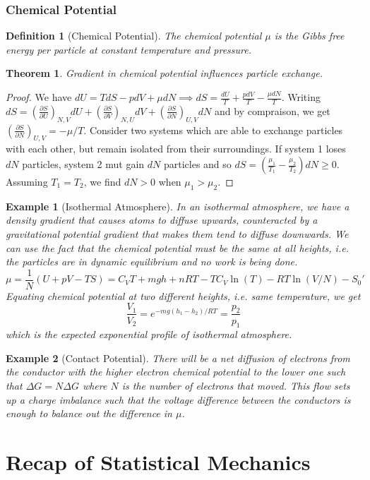 \documentclass[a4paper]{article}
\newtheorem{defi}{Definition}[section]
\newtheorem{eg}{Example}[section]
\newtheorem{thm}{Theorem}[section]
\theoremstyle{new}
\begin{document}
\subsubsection*{Chemical Potential}
\begin{defi}[Chemical Potential]
The chemical potential $\mu$ is the Gibbs free energy per particle at constant temperature and pressure.
\end{defi}
\begin{thm}
Gradient in chemical potential influences particle exchange.
\end{thm}
\begin{proof}
We have $dU=TdS-pdV+\mu dN\implies dS=\frac{dU}{T}+\frac{pdV}{T}-\frac{\mu dN}{T}$. Writing $dS=(\frac{\partial S}{\partial U})_{N,V}dU+(\frac{\partial S}{\partial V})_{N,U}dV+(\frac{\partial S}{\partial N})_{U,V}dN$ and by compraison, we get $(\frac{\partial S}{\partial N})_{U,V}=-\mu/T$. Consider two systems which are able to exchange particles with each other, but remain isolated from their surroundings. If system 1 loses $dN$ particles, system 2 mut gain $dN$ particles and so $dS=(\frac{\mu_1}{T_1}-\frac{\mu_2}{T_2})dN\geq0$. Assuming $T_1=T_2$, we find $dN>0$ when $\mu_1>\mu_2$.
\end{proof}
\begin{eg}[Isothermal Atmosphere]
In an isothermal atmosphere, we have a density gradient that causes atoms to diffuse upwards, counteracted by a gravitational potential gradient that makes them tend to diffuse downwards. We can use the fact that the chemical potential must be the same at all heights, i.e. the particles are in dynamic equilibrium and no work is being done.
$$\mu=\frac{1}{N}(U+pV-TS)=C_VT+mgh+nRT-TC_V\ln(T)-RT\ln(V/N)-S_0'$$
Equating chemical potential at two different heights, i.e. same temperature, we get
$$\frac{V_1}{V_2}=e^{-mg(h_1-h_2)/RT}=\frac{p_2}{p_1}$$
which is the expected exponential profile of isothermal atmosphere.
\end{eg}
\begin{eg}[Contact Potential]
There will be a net diffusion of electrons from the conductor with the higher electron chemical potential to the lower one such that $\Delta G=N\Delta G$ where $N$ is the number of electrons that moved. This flow sets up a charge imbalance such that the voltage difference between the conductors is enough to balance out the difference in $\mu$.
\end{eg}

\newpage
\section{Recap of Statistical Mechanics}
\end{document}
